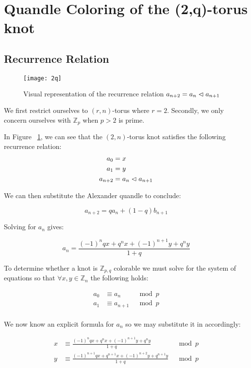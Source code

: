 \documentclass[paper.tex]{subfiles}
\begin{document}
\section{Quandle Coloring of the (2,q)-torus knot}\label{sec:2ntorus}

\subsection{Recurrence Relation}

\begin{figure}[h]
  \centering
  \texttt{[image: 2q]}
  \caption{Visual representation of the recurrence relation $a_{n+2} = a_{n} \vartriangleleft a_{n+1}$~\cite{Cusick}}\label{fig:2q}
\end{figure}

We first restrict ourselves to $(r,n)$-torus where $r = 2$. Secondly, we only concern ourselves with $\mathbb{Z}_p$ when $p > 2$ is prime.

In Figure ~\ref{fig:2q}, we can see that the $(2,n)$-torus knot satisfies the following recurrence relation:
\begin{align*}
	a_0 &= x \\
	a_1 &= y \\
	a_{n+2} &= a_{n} \vartriangleleft a_{n+1} \\
\end{align*}

We can then substitute the Alexander quandle to conclude:

$$ a_{n+2} = qa_{n} + (1-q)b_{n+1} $$

Solving for
 $a_n$ gives:

$$a_n = \frac{(-1)^nqx+q^nx+(-1)^{n+1}y+q^ny}{1+q}$$

To determine whether a knot is $\mathbb{Z}_{p,q}$ colorable we must solve for the system of equations so that $\forall x,y \in \mathbb{Z}_n$ the following holds:

\begin{align*}
	a_0 &\equiv a_{n}  & \mod{p} \\
	a_1 &\equiv a_{n+1} & \mod{p} \\
\end{align*}

We now know an explicit formula for $a_n$ so we may substitute it in accordingly:

\begin{align*}
	x &\equiv \frac{(-1)^nqx+q^nx+(-1)^{n+1}y+q^ny}{1+q} & \mod{p} \\
	y &\equiv \frac{(-1)^{n+1}qx+q^{n+1}x+(-1)^{n+2}y+q^{n+1}y}{1+q} & \mod{p} \\
\end{align*}
\end{document}
